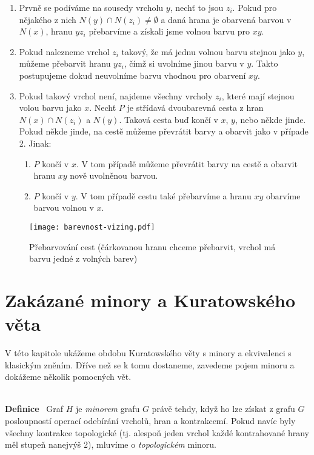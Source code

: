\documentclass{article}
\renewcommand{\paragraph}[1]{\ \\\smallskip\noindent\textbf{#1}\ }
\begin{document}
\begin{enumerate}
	\item Prvně se podíváme na sousedy vrcholu $y$, nechť to jsou $z_i$. Pokud 
	pro nějakého z nich $N(y) \cap N(z_i) \neq \emptyset$ a daná hrana je 
	obarvená barvou v $N(x)$, hranu $yz_i$ přebarvíme a získali jsme volnou 
	barvu pro $xy$.
	\item Pokud nalezneme vrchol $z_i$ takový, že má jednu volnou barvu stejnou 
	jako $y$, můžeme přebarvit hranu $yz_i$, čímž si uvolníme jinou barvu v $y$.  
	Takto postupujeme dokud neuvolníme barvu vhodnou pro obarvení $xy$.
	\item Pokud takový vrchol není, najdeme všechny vrcholy $z_i$, které mají 
	stejnou volou barvu jako $x$. Nechť $P$ je střídavá dvoubarevná cesta z hran 
	$N(x)\cap N(z_i)$ a $N(y)$. Taková cesta buď končí v $x$, $y$, nebo někde 
	jinde.  Pokud někde jinde, na cestě můžeme převrátit barvy a obarvit jako v 
	případe 2.  Jinak:
	\begin{enumerate}
		\item $P$ končí v $x$. V tom případě můžeme převrátit barvy na cestě a 
		obarvit hranu $xy$ nově uvolněnou barvou.
		\item $P$ končí v $y$. V tom případě cestu také přebarvíme a hranu $xy$ 
		obarvíme barvou volnou v $x$.
	\end{enumerate}
\end{enumerate}
\begin{figure}[H]
\centering
\texttt{[image: barevnost-vizing.pdf]}
\caption{Přebarvování cest (čárkovanou hranu chceme přebarvit, vrchol má barvu 
jedné z volných barev)}
\label{barevnost:vizing}
\end{figure}



\section{Zakázané minory a Kuratowského věta}
V této kapitole ukážeme obdobu Kuratowského věty s minory a ekvivalenci s 
klasickým zněním. Dříve než se k tomu dostaneme, zavedeme pojem minoru a 
dokážeme několik pomocných vět.

\paragraph{Definice} Graf $H$ je \textit{minorem} grafu $G$ právě tehdy, když ho 
lze získat z grafu $G$ posloupností operací odebírání vrcholů, hran a 
kontrakcemí. Pokud navíc byly všechny kontrakce topologické (tj. alespoň jeden 
vrchol každé kontrahované hrany měl stupeň nanejvýš 2), mluvíme o 
\textit{topologickém} minoru.
\end{document}
